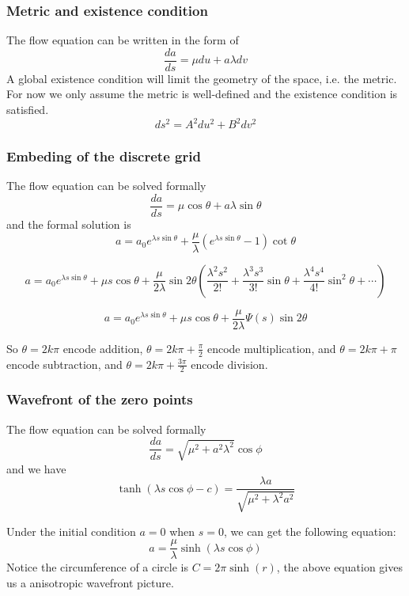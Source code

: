\documentclass[aspectratio=169]{beamer}
\begin{document}
\begin{frame}
    \frametitle{Metric and existence condition}
    The flow equation can be written in the form of
    \[
        \frac{da}{ds} = \mu du + a \lambda dv
    \]
    A global existence condition will limit the geometry of the space, i.e. the metric.
    For now we only assume the metric is well-defined and the existence condition is satisfied.
    \begin{equation}
        ds^2 = A^2 du^2 + B^2 dv^2\label{eq:metric}
    \end{equation}
\end{frame}

\begin{frame}
    \frametitle{Embeding of the discrete grid}
    The flow equation can be solved formally
    \[
        \frac{da}{ds} = \mu \cos \theta + a \lambda \sin \theta
    \]
    and the formal solution is
    \begin{equation}\label{eq:directformalsolution}
    a =  a_0 e^{\lambda s \sin \theta} + \frac{\mu}{\lambda} (e^{\lambda s \sin \theta} - 1) \cot \theta
    \end{equation}

    \[
        a = a_0 e^{\lambda s \sin \theta} + \mu s \cos \theta + \frac{\mu}{2\lambda} \sin 2\theta (\frac{\lambda^2s^2}{2!} + \frac{\lambda^3s^3}{3!} \sin \theta + \frac{\lambda^4s^4}{4!} \sin^2 \theta + \cdots)
    \]

    \[
        a = a_0 e^{\lambda s \sin \theta} + \mu s \cos \theta + \frac{\mu}{2\lambda} \Psi(s) \sin 2\theta
    \]

    So $\theta = 2k\pi$ encode addition, $\theta = 2k\pi + \frac{\pi}{2}$ encode multiplication,
    and $\theta = 2k\pi + \pi$ encode subtraction, and $\theta = 2k\pi + \frac{3\pi}{2}$ encode division.
\end{frame}

\begin{frame}
    \frametitle{Wavefront of the zero points}
    The flow equation can be solved formally
    \[
        \frac{da}{ds} = \sqrt {\mu^2 + a^2 \lambda^2} \cos \phi\label{eq:contour-gradient-flow}
    \]
    and we have
    \[
    \tanh(\lambda s \cos \phi - c) = \frac{\lambda a}{\sqrt{\mu^2 + \lambda^2 a^2}}
    \]

    Under the initial condition $a = 0$ when $s = 0$, we can get the following equation:
    \begin{equation}
        a = \frac{\mu}{\lambda} \sinh(\lambda s \cos \phi)\label{eq:gradevo2}
    \end{equation}
    Notice the circumference of a circle is $C = 2 \pi \sinh(r)$, the above equation gives us a anisotropic wavefront picture.
\end{frame}
\end{document}
